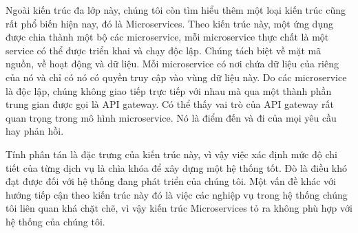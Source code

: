 \par
Ngoài kiến trúc đa lớp này, chúng tôi còn tìm hiểu thêm một loại kiến trúc cũng rất phổ biến hiện nay, đó là Microservices. Theo kiến trúc này, một ứng dụng được chia thành một bộ các microservice, mỗi microservice thực chất là một service có thể được triển khai và chạy độc lập. Chúng tách biệt về mặt mã nguồn, về hoạt động và dữ liệu. Mỗi microservice có nơi chứa dữ liệu của riêng của nó và chỉ có nó có quyền truy cập vào vùng dữ liệu này. Do các microservice là độc lập, chúng không giao tiếp trực tiếp với nhau mà qua một thành phần trung gian được gọi là API gateway. Có thể thấy vai trò của API gateway rất quan trọng trong mô hình microservice. Nó là điểm đến và đi của mọi yêu cầu hay phản hồi.
\par
Tính phân tán là đặc trưng của kiến trúc này, vì vậy việc xác định mức độ chi
tiết của từng dịch vụ là chìa khóa để xây dựng một hệ thống tốt. Đò là điều khó
đạt được đối với hệ thống đang phát triển của chúng tôi. Một vấn đề khác với
hướng tiếp cận theo kiến trúc này đó là việc các nghiệp vụ trong hệ thống chúng
tôi liên quan khá chặt chẽ, vì vậy kiến trúc Microservices tỏ ra không phù hợp
với hệ thống của chúng tôi.